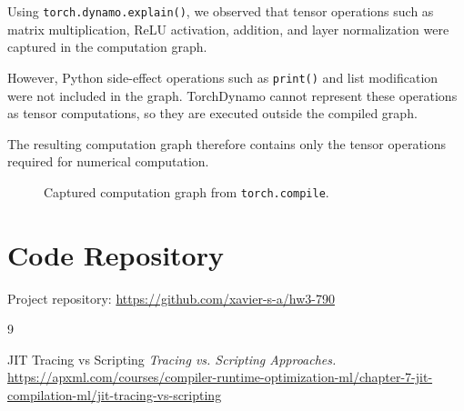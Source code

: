 \documentclass{article}
\begin{document}
Using \texttt{torch.dynamo.explain()}, we observed that tensor operations such as matrix multiplication, ReLU activation, addition, and layer normalization were captured in the computation graph.

However, Python side-effect operations such as \texttt{print()} and list modification were not included in the graph. TorchDynamo cannot represent these operations as tensor computations, so they are executed outside the compiled graph.

The resulting computation graph therefore contains only the tensor operations required for numerical computation.

\begin{figure}[H]
\centering
{}
\caption{Captured computation graph from \texttt{torch.compile}.}
\end{figure}

\section*{Code Repository}

Project repository:  
\url{https://github.com/xavier-s-a/hw3-790}

\begin{thebibliography}{9}

JIT Tracing vs Scripting
\textit{Tracing vs. Scripting Approaches.}  
\url{https://apxml.com/courses/compiler-runtime-optimization-ml/chapter-7-jit-compilation-ml/jit-tracing-vs-scripting}



\end{thebibliography}
\end{document}
